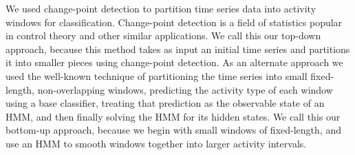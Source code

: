 We used change-point detection to partition time series data into activity windows for classification.
Change-point detection is a field of statistics popular in control theory and other similar
applications. We call this our top-down approach, because this
method takes as input an initial time series and partitions it into smaller pieces using
change-point detection. As an alternate approach we
used the well-known technique of partitioning the time series into small fixed-length,
non-overlapping windows, predicting the activity type of each window
using a base classifier, treating that prediction as the observable
state of an HMM, and then finally solving the HMM for its hidden states. We call
this our bottom-up approach, because we begin with small windows of fixed-length,
and use an HMM to smooth windows together into larger activity intervals.
